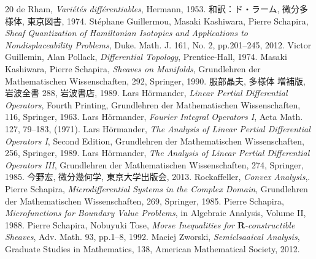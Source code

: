 \documentclass[leqno, 10pt, a4paper, dvipdfmx]{jsarticle}
\theoremstyle{definition}
\newcommand{\rr}{\mathbf{R}}
\numberwithin{equation}{section}
\theoremstyle{mystyle}
\begin{document}
\begin{thebibliography}{20} 
  de Rham, \textit{Vari\'et\'es diff\'erentiables}, Hermann, 1953.
  和訳：ド・ラーム, 微分多様体, 東京図書, 1974.
   St\'ephane Guillermou, 
  Masaki Kashiwara, Pierre Schapira, 
  \textit{Sheaf Quantization of Hamiltonian Isotopies and Applications to Nondisplaceability Problems}, 
  Duke. Math. J. 161, No. 2, pp.201--245, 2012.  
   Victor Guillemin, Alan Pollack, 
    \textit{Differential Topology}, 
    Prentice-Hall, 1974.
   Masaki Kashiwara, Pierre Schapira, 
    \textit{Sheaves on Manifolds}, 
    Grundlehren der Mathematischen Wissenschaften, 292, Springer, 1990.
   服部晶夫, 多様体 増補版, 岩波全書 288, 岩波書店, 1989.
   Lars H\"ormander, 
  \textit{Linear Pertial Differential Operators}, Fourth Printing, 
  Grundlehren der Mathematischen Wissenschaften, 116, Springer, 1963.
   Lars H\"ormander, 
  \textit{Fourier Integral Operators I}, 
  Acta Math. 127, 79--183, (1971).
   Lars H\"ormander, 
  \textit{The Analysis of Linear Pertial Differential Operators I}, Second Edition,
  Grundlehren der Mathematischen Wissenschaften, 256, Springer, 1989.
   Lars H\"ormander, 
  \textit{The Analysis of Linear Pertial Differential Operators III}, 
  Grundlehren der Mathematischen Wissenschaften, 274, Springer, 1985.
   今野宏, 微分幾何学, 東京大学出版会, 2013.
   Rockaffeller, \textit{Convex Analysis},. 
   Pierre Schapira, 
  \textit{Microdifferential Systems in the Complex Domain}, 
  Grundlehren der Mathematischen Wissenschaften, 269, 
  Springer, 1985.
   Pierre Schapira, 
  \textit{Microfunctions for Boundary Value Problems}, 
  in Algebraic Analysis, Volume II, 1988.
   Pierre Schapira, Nobuyuki Tose, 
  \textit{Morse Inequalities for \(\rr\)-constructible Sheaves}, 
  Adv. Math. 93, pp.1--8, 1992. 
   Maciej Zworski,
  \textit{Semiclsaaical Analysis}, 
  Graduate Studies in Mathematics, 138, American Mathematical Society, 2012. 
\end{thebibliography}

\end{document}
